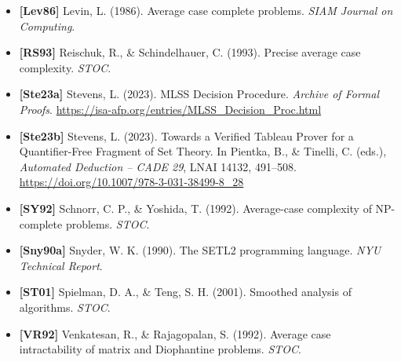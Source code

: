 \documentclass[11pt,a4paper]{article}
\begin{document}
\begin{itemize}
  \textbf{{[}Gur91{]}} Gurevich, Y. (1991). Average case completeness. \emph{Journal of Computer and System Sciences}.
\item
  \textbf{{[}Lev86{]}} Levin, L. (1986). Average case complete problems. \emph{SIAM Journal on Computing}.
\item
  \textbf{{[}RS93{]}} Reischuk, R., \& Schindelhauer, C. (1993). Precise average case complexity. \emph{STOC}.
\item
  \textbf{{[}Ste23a{]}} Stevens, L. (2023). MLSS Decision Procedure. \emph{Archive of Formal Proofs}. \url{https://isa-afp.org/entries/MLSS_Decision_Proc.html}
\item
  \textbf{{[}Ste23b{]}} Stevens, L. (2023). Towards a Verified Tableau Prover for a Quantifier-Free Fragment of Set Theory. In Pientka, B., \& Tinelli, C. (eds.), \emph{Automated Deduction -- CADE 29}, LNAI 14132, 491--508. \url{https://doi.org/10.1007/978-3-031-38499-8_28}
\item
  \textbf{{[}SY92{]}} Schnorr, C. P., \& Yoshida, T. (1992). Average-case complexity of NP-complete problems. \emph{STOC}.
\item
  \textbf{{[}Sny90a{]}} Snyder, W. K. (1990). The SETL2 programming language. \emph{NYU Technical Report}.
\item
  \textbf{{[}ST01{]}} Spielman, D. A., \& Teng, S. H. (2001). Smoothed analysis of algorithms. \emph{STOC}.
\item
  \textbf{{[}VR92{]}} Venkatesan, R., \& Rajagopalan, S. (1992). Average case intractability of matrix and Diophantine problems. \emph{STOC}.
\end{itemize}
\end{document}
